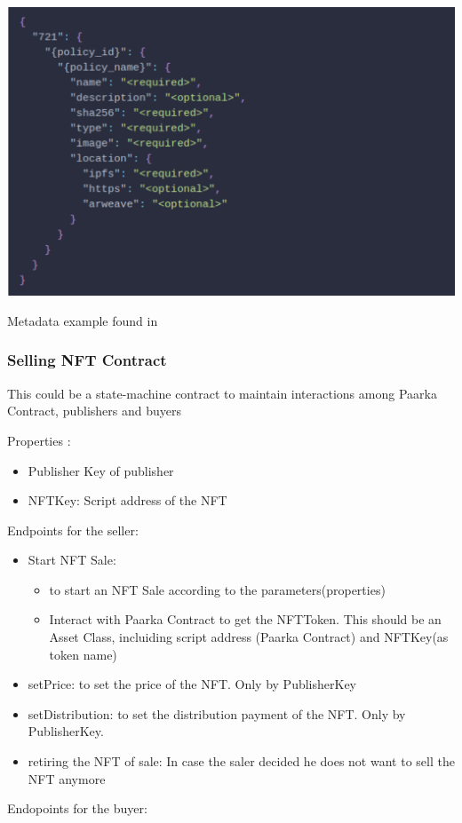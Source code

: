 \documentclass[a4paper,11pt]{article}
\begin{document}
\begin{minipage}[c]{\textwidth}
	
	    \begin{center}

	\includegraphics[scale=0.3]{metadata.pdf}


	    \end{center}
    Metadata example found in \cite{metadata}
\end{minipage}

\subsubsection{Selling NFT Contract}

This could be a state-machine contract to maintain interactions among Paarka Contract, publishers and buyers

Properties :

\begin{itemize}
\item Publisher Key of publisher
\item NFTKey: Script address of the NFT



\end{itemize}

Endpoints for the seller:

\begin{itemize}
	\item Start NFT Sale:
	\begin{itemize}
		\item to start an NFT Sale according to the parameters(properties)
		\item Interact with Paarka Contract to get the NFTToken. This should be an Asset Class, incluiding script address (Paarka Contract) and NFTKey(as token name)
	
		
	\end{itemize}
	\item setPrice: to set the price of the NFT. Only by PublisherKey
\item setDistribution: to set the distribution payment of the NFT. Only by PublisherKey.
\item retiring the NFT of sale: In case the saler decided he does not want to sell the NFT anymore
\end{itemize}
Endopoints for the buyer:
\end{document}
